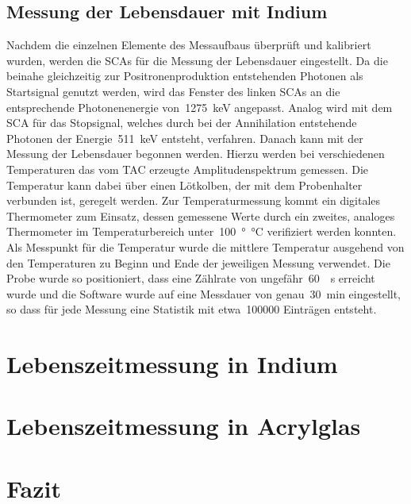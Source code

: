 \documentclass[11pt, a4paper]{article}
\numberwithin{equation}{section}
\begin{document}
\subsection{Messung der Lebensdauer mit Indium}

Nachdem die einzelnen Elemente des Messaufbaus überprüft und kalibriert wurden, werden die SCAs für die Messung der Lebensdauer eingestellt.
Da die beinahe gleichzeitig zur Positronenproduktion entstehenden Photonen als Startsignal genutzt werden, wird das Fenster des linken SCAs an die entsprechende Photonenenergie von~\SI{1275}{keV} angepasst.
Analog wird mit dem SCA für das Stopsignal, welches durch bei der Annihilation entstehende Photonen der Energie~\SI{511}{keV} entsteht, verfahren.
Danach kann mit der Messung der Lebensdauer begonnen werden.
Hierzu werden bei verschiedenen Temperaturen das vom TAC erzeugte Amplitudenspektrum gemessen.
Die Temperatur kann dabei über einen Lötkolben, der mit dem Probenhalter verbunden ist, geregelt werden.
Zur Temperaturmessung kommt ein digitales Thermometer zum Einsatz, dessen gemessene Werte durch ein zweites, analoges Thermometer im Temperaturbereich unter~\SI{100}{\degree\celsius} verifiziert werden konnten.
Als Messpunkt für die Temperatur wurde die mittlere Temperatur ausgehend von den Temperaturen zu Beginn und Ende der jeweiligen Messung verwendet.
Die Probe wurde so positioniert, dass eine Zählrate von ungefähr~\SI{60}{\per\second} erreicht wurde und die Software wurde auf eine Messdauer von genau~\SI{30}{min} eingestellt, so dass für jede Messung eine Statistik mit etwa~\num{100000} Einträgen entsteht.


\section{Lebenszeitmessung in Indium}

\section{Lebenszeitmessung in Acrylglas}

\section{Fazit}
\end{document}
